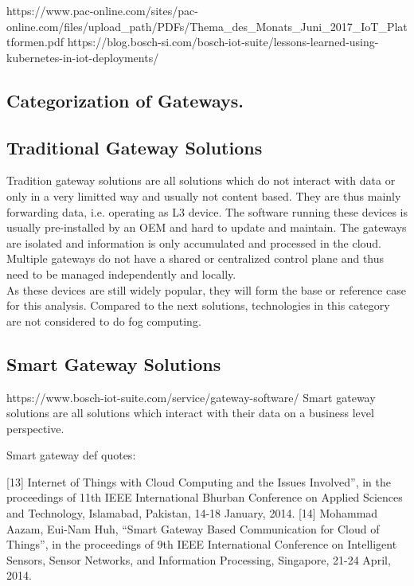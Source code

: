 https://www.pac-online.com/sites/pac-online.com/files/upload_path/PDFs/Thema_des_Monats_Juni_2017_IoT_Plattformen.pdf
https://blog.bosch-si.com/bosch-iot-suite/lessons-learned-using-kubernetes-in-iot-deployments/

\subsection{Categorization of Gateways.}


\subsection{Traditional Gateway Solutions}
Tradition gateway solutions are all solutions which do not interact with data or only in a very limitted way and usually not content based. They are thus mainly forwarding data, i.e. operating as L3 device. The software running these devices is usually pre-installed by an OEM and hard to update and maintain. The gateways are isolated and information is only accumulated and processed in the cloud. Multiple gateways do not have a shared or centralized control plane and thus need to be managed independently and locally.\\
As these devices are still widely popular, they will form the base or reference case for this analysis. Compared to the next solutions, technologies in this category are not considered to do fog computing.


\subsection{Smart Gateway Solutions}
https://www.bosch-iot-suite.com/service/gateway-software/
Smart gateway solutions are all solutions which interact with their data on a business level perspective.

Smart gateway def  quotes:

[13] Internet of Things with Cloud Computing and the Issues Involved”, in
the proceedings of 11th IEEE International Bhurban Conference on
Applied Sciences and Technology, Islamabad, Pakistan, 14-18 January,
2014.
[14] Mohammad Aazam, Eui-Nam Huh, “Smart Gateway Based
Communication for Cloud of Things”, in the proceedings of 9th IEEE
International Conference on Intelligent Sensors, Sensor Networks, and
Information Processing, Singapore, 21-24 April, 2014.


